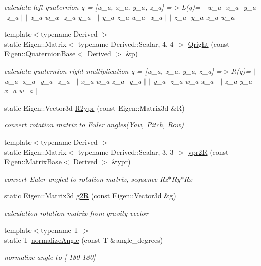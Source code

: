 \begin{DoxyCompactItemize}
\begin{DoxyCompactList}\small\item\em calculate left quaternion q = \mbox{[}w\+\_\+a, x\+\_\+a, y\+\_\+a, z\+\_\+a\mbox{]} =$>$L(q)= $\vert$ w\+\_\+a -\/x\+\_\+a -\/y\+\_\+a -\/z\+\_\+a $\vert$ $\vert$ x\+\_\+a w\+\_\+a -\/z\+\_\+a y\+\_\+a $\vert$ $\vert$ y\+\_\+a z\+\_\+a w\+\_\+a -\/x\+\_\+a $\vert$ $\vert$ z\+\_\+a -\/y\+\_\+a x\+\_\+a w\+\_\+a $\vert$ \end{DoxyCompactList}\item 
{\footnotesize template$<$typename Derived $>$ }\\static Eigen\+::\+Matrix$<$ typename Derived\+::\+Scalar, 4, 4 $>$ \hyperlink{classUtility_a65053cec3b81ab32f5e55d1d81f3498a}{Qright} (const Eigen\+::\+Quaternion\+Base$<$ Derived $>$ \&p)
\begin{DoxyCompactList}\small\item\em calculate quaternion right multiplication q = \mbox{[}w\+\_\+a, x\+\_\+a, y\+\_\+a, z\+\_\+a\mbox{]} =$>$R(q)= $\vert$ w\+\_\+a -\/x\+\_\+a -\/y\+\_\+a -\/z\+\_\+a $\vert$ $\vert$ x\+\_\+a w\+\_\+a z\+\_\+a -\/y\+\_\+a $\vert$ $\vert$ y\+\_\+a -\/z\+\_\+a w\+\_\+a x\+\_\+a $\vert$ $\vert$ z\+\_\+a y\+\_\+a -\/x\+\_\+a w\+\_\+a $\vert$ \end{DoxyCompactList}\item 
static Eigen\+::\+Vector3d \hyperlink{classUtility_a9a4d4e66c5288c4a8fb5d2e6a0faf840}{R2ypr} (const Eigen\+::\+Matrix3d \&R)
\begin{DoxyCompactList}\small\item\em convert rotation matrix to Euler angles(\+Yaw, Pitch, Row) \end{DoxyCompactList}\item 
{\footnotesize template$<$typename Derived $>$ }\\static Eigen\+::\+Matrix$<$ typename Derived\+::\+Scalar, 3, 3 $>$ \hyperlink{classUtility_a2cf771f4b84aa9056e60119953f91917}{ypr2R} (const Eigen\+::\+Matrix\+Base$<$ Derived $>$ \&ypr)
\begin{DoxyCompactList}\small\item\em convert Euler angled to rotation matrix, sequence Rz$\ast$\+Ry$\ast$\+Rx \end{DoxyCompactList}\item 
static Eigen\+::\+Matrix3d \hyperlink{classUtility_a43109837bc1af099708bbf7c269deb79}{g2R} (const Eigen\+::\+Vector3d \&g)
\begin{DoxyCompactList}\small\item\em calculation rotation matrix from gravity vector \end{DoxyCompactList}\item 
{\footnotesize template$<$typename T $>$ }\\static T \hyperlink{classUtility_af36ac46f69e5f6ecf45b9ea471e73cb1}{normalize\+Angle} (const T \&angle\+\_\+degrees)
\begin{DoxyCompactList}\small\item\em normalize angle to \mbox{[}-\/180 180\mbox{]} \end{DoxyCompactList}\end{DoxyCompactItemize}


